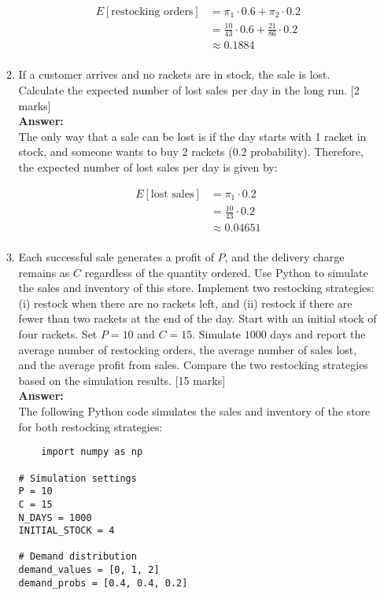 \documentclass[12pt]{article}
\begin{document}
\begin{enumerate}
\begin{enumerate}
\begin{align*}
E[\text{restocking orders}] &= \pi_1 \cdot 0.6 + \pi_2 \cdot 0.2 \\
&= \frac{10}{43} \cdot 0.6 + \frac{21}{86} \cdot 0.2 \\
&\approx 0.1884 \\
\end{align*}
%

\item If a customer arrives and no rackets are in stock, the sale is lost. Calculate the expected number of lost sales per day in the long run. 
			\hfill [2 marks]
%
\\
\textbf{Answer:}
\\
The only way that a sale can be lost is if the day starts with 1 racket in stock, and someone wants to buy 2 rackets (0.2 probability). Therefore, the expected number of lost sales per day is given by:

\begin{align*}
E[\text{lost sales}] &= \pi_1 \cdot 0.2 \\
&= \frac{10}{43} \cdot 0.2 \\
&\approx 0.04651 \\
\end{align*}

\item Each successful sale generates a profit of $P$, and the delivery charge remains as $C$ regardless of the quantity ordered. Use {\sf Python} to simulate the sales and inventory of this store. Implement two restocking strategies: (i) restock when there are no rackets left, and (ii) restock if there are fewer than two rackets at the end of the day. 
Start with an initial stock of four rackets. Set $P=10$ and $C=15$. Simulate $1000$ days and report the average number of restocking orders, the average number of sales lost, and the average profit from sales. Compare the two restocking strategies based on the simulation results.   
			\hfill [15 marks]
%
\\
\textbf{Answer:}
\\

The following Python code simulates the sales and inventory of the store for both restocking strategies:
\begin{verbatim}
	import numpy as np

# Simulation settings
P = 10
C = 15
N_DAYS = 1000
INITIAL_STOCK = 4

# Demand distribution
demand_values = [0, 1, 2]
demand_probs = [0.4, 0.4, 0.2]


\end{verbatim}
\end{enumerate}
\end{enumerate}
\end{document}
